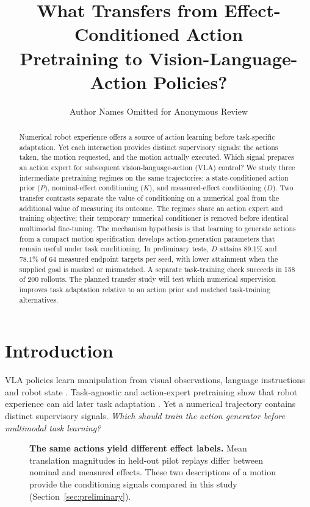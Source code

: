 \documentclass[conference]{IEEEtran}
\begin{document}
\title{What Transfers from Effect-Conditioned Action\\Pretraining to Vision-Language-Action Policies?}
\author{Author Names Omitted for Anonymous Review}
\maketitle
\begin{abstract}
Numerical robot experience offers a source of action learning before task-specific adaptation. Yet each interaction provides distinct supervisory signals: the actions taken, the motion requested, and the motion actually executed. Which signal prepares an action expert for subsequent vision-language-action (VLA) control? We study three intermediate pretraining regimes on the same trajectories: a state-conditioned action prior ($P$), nominal-effect conditioning ($K$), and measured-effect conditioning ($D$). Two transfer contrasts separate the value of conditioning on a numerical goal from the additional value of measuring its outcome. The regimes share an action expert and training objective; their temporary numerical conditioner is removed before identical multimodal fine-tuning. The mechanism hypothesis is that learning to generate actions from a compact motion specification develops action-generation parameters that remain useful under task conditioning. In preliminary tests, $D$ attains 89.1\% and 78.1\% of 64 measured endpoint targets per seed, with lower attainment when the supplied goal is masked or mismatched. A separate task-training check succeeds in 158 of 200 rollouts. The planned transfer study will test which numerical supervision improves task adaptation relative to an action prior and matched task-training alternatives.
\end{abstract}
\IEEEpeerreviewmaketitle

\section{Introduction}
VLA policies learn manipulation from visual observations, language instructions and robot state \citep{black2025pi0,shukor2025smolvla,kim2024openvla}. Task-agnostic and action-expert pretraining show that robot experience can aid later task adaptation \citep{shi2026tap,hu2026arvla}. Yet a numerical trajectory contains distinct supervisory signals. \emph{Which should train the action generator before multimodal task learning?}

\begin{figure}[!b]
\centering
\resizebox{.97\columnwidth}{!}{}
\caption{\textbf{The same actions yield different effect labels.} Mean translation magnitudes in held-out pilot replays differ between nominal and measured effects. These two descriptions of a motion provide the conditioning signals compared in this study (Section~\ref{sec:preliminary}).}
\label{fig:example}
\end{figure}
\end{document}
